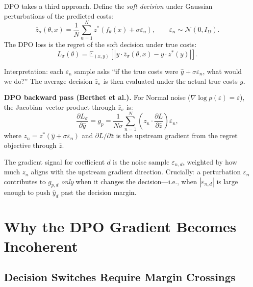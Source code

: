 \documentclass[11pt]{article}
\begin{document}
DPO takes a third approach.  Define the \emph{soft decision} under Gaussian
perturbations of the predicted costs:
\begin{equation}
  \bar{z}_\sigma(\theta, x) = \frac{1}{N}\sum_{n=1}^{N}
    z^*\!\left(f_\theta(x) + \sigma\varepsilon_n\right),
  \qquad \varepsilon_n \sim \mathcal{N}(0, I_D).
  \label{eq:zbar}
\end{equation}
The DPO loss is the regret of the soft decision under true costs:
\begin{equation}
  L_\sigma(\theta) = \mathbb{E}_{(x,y)}\!\left[
    \left|y \cdot \bar{z}_\sigma(\theta,x) - y \cdot z^*(y)\right|\right].
  \label{eq:dpo-loss}
\end{equation}

Interpretation: each $\varepsilon_n$ sample asks ``if the true costs were
$\hat{y} + \sigma\varepsilon_n$, what would we do?''  The average decision
$\bar{z}_\sigma$ is then evaluated under the actual true costs $y$.

\textbf{DPO backward pass (Berthet et al.).}
For Normal noise ($\nabla \log p(\varepsilon) = \varepsilon$), the Jacobian--vector
product through $\bar{z}_\sigma$ is:
\begin{equation}
  \frac{\partial L_\sigma}{\partial \hat{y}} = g_p
  = \frac{1}{N\sigma}\sum_{n=1}^{N}
    \left(z_n \cdot \frac{\partial L}{\partial \bar{z}}\right)\varepsilon_n,
  \label{eq:gp}
\end{equation}
where $z_n = z^*(\hat{y} + \sigma\varepsilon_n)$ and
$\partial L / \partial \bar{z}$ is the upstream gradient from the regret
objective through $\bar{z}$.

The gradient signal for coefficient $d$ is the noise sample $\varepsilon_{n,d}$,
weighted by how much $z_n$ aligns with the upstream gradient direction.
Crucially: a perturbation $\varepsilon_n$ contributes to $g_{p,d}$ \emph{only}
when it changes the decision---i.e., when $|\varepsilon_{n,d}|$ is large enough
to push $\hat{y}_d$ past the decision margin.

\section{Why the DPO Gradient Becomes Incoherent}

\subsection{Decision Switches Require Margin Crossings}
\end{document}
